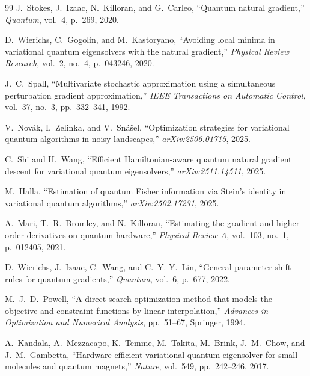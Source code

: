 \documentclass[11pt,a4paper]{article}
\begin{document}
\begin{thebibliography}{99}
J.~Stokes, J.~Izaac, N.~Killoran, and G.~Carleo,
\newblock ``Quantum natural gradient,''
\newblock \emph{Quantum}, vol.~4, p.~269, 2020.

D.~Wierichs, C.~Gogolin, and M.~Kastoryano,
\newblock ``Avoiding local minima in variational quantum eigensolvers with the natural gradient,''
\newblock \emph{Physical Review Research}, vol.~2, no.~4, p.~043246, 2020.

J.~C.~Spall,
\newblock ``Multivariate stochastic approximation using a simultaneous perturbation gradient approximation,''
\newblock \emph{IEEE Transactions on Automatic Control}, vol.~37, no.~3, pp.~332--341, 1992.

V.~Nov{\'a}k, I.~Zelinka, and V.~Sn{\'a}{\v{s}}el,
\newblock ``Optimization strategies for variational quantum algorithms in noisy landscapes,''
\newblock \emph{arXiv:2506.01715}, 2025.

C.~Shi and H.~Wang,
\newblock ``Efficient Hamiltonian-aware quantum natural gradient descent for variational quantum eigensolvers,''
\newblock \emph{arXiv:2511.14511}, 2025.

M.~Halla,
\newblock ``Estimation of quantum Fisher information via Stein's identity in variational quantum algorithms,''
\newblock \emph{arXiv:2502.17231}, 2025.

A.~Mari, T.~R.~Bromley, and N.~Killoran,
\newblock ``Estimating the gradient and higher-order derivatives on quantum hardware,''
\newblock \emph{Physical Review A}, vol.~103, no.~1, p.~012405, 2021.

D.~Wierichs, J.~Izaac, C.~Wang, and C.~Y.-Y.~Lin,
\newblock ``General parameter-shift rules for quantum gradients,''
\newblock \emph{Quantum}, vol.~6, p.~677, 2022.

M.~J.~D.~Powell,
\newblock ``A direct search optimization method that models the objective and constraint functions by linear interpolation,''
\newblock \emph{Advances in Optimization and Numerical Analysis}, pp.~51--67, Springer, 1994.

A.~Kandala, A.~Mezzacapo, K.~Temme, M.~Takita, M.~Brink, J.~M.~Chow, and J.~M.~Gambetta,
\newblock ``Hardware-efficient variational quantum eigensolver for small molecules and quantum magnets,''
\newblock \emph{Nature}, vol.~549, pp.~242--246, 2017.


\end{thebibliography}
\end{document}
